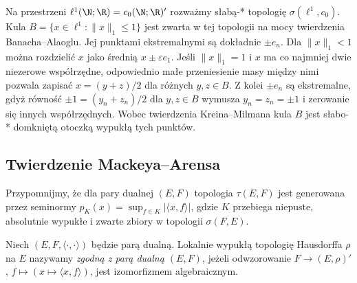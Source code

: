 \begin{przyklad}
\label{ex:krein-l1-weakstar9}
Na przestrzeni $\ell^1(\N;\R)=c_0(\N;\R)'$ rozważmy
słabą-* topologię $\sigma(\ell^1,c_0)$.
Kula $B=\{x\in\ell^1:\|x\|_1\le1\}$ jest zwarta
w tej topologii na mocy twierdzenia Banacha--Alaoglu.
Jej punktami ekstremalnymi są dokładnie $\pm e_n$.
Dla $\|x\|_1<1$ można rozdzielić $x$ jako średnią
$x\pm\varepsilon e_1$. Jeśli $\|x\|_1=1$ i $x$ ma
co najmniej dwie niezerowe współrzędne, odpowiednio małe
przeniesienie masy między nimi pozwala zapisać
$x=(y+z)/2$ dla różnych $y,z\in B$.
Z kolei $\pm e_n$ są ekstremalne, gdyż równość
$\pm1=(y_n+z_n)/2$ dla $y,z\in B$ wymusza
$y_n=z_n=\pm1$ i zerowanie się innych współrzędnych.
Wobec twierdzenia Kreina--Milmana kula $B$ jest słabo-*
domkniętą otoczką wypukłą tych punktów.
\end{przyklad}


\subsection{Twierdzenie Mackeya--Arensa}

Przypomnijmy, że dla pary dualnej $(E,F)$ topologia
$\tau(E,F)$ jest generowana przez seminormy
$p_K(x)=\sup_{f\in K}|\langle x,f\rangle|$, gdzie $K$
przebiega niepuste, absolutnie wypukłe i zwarte zbiory
w topologii $\sigma(F,E)$.

\begin{definicja}\label{def:compatible-duality}
Niech $(E,F,\langle\cdot,\cdot\rangle)$ będzie parą dualną.
Lokalnie wypukłą topologię Hausdorffa $\rho$ na $E$ nazywamy
\emph{zgodną z parą dualną $(E,F)$}, jeżeli odwzorowanie
$F\to(E,\rho)'$, $f\mapsto(x\mapsto\langle x,f\rangle)$,
jest izomorfizmem algebraicznym.
\end{definicja}

